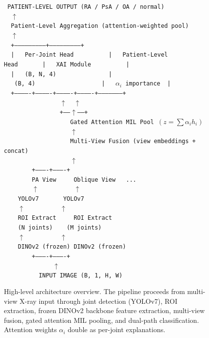 \documentclass{article}
\begin{document}
\begin{figure}[h]
\centering
\begin{minipage}{0.92\linewidth}
\small\tt
\noindent
PATIENT-LEVEL OUTPUT (RA / PsA / OA / normal)\\
~~$\uparrow$~~\\
~~Patient-Level Aggregation (attention-weighted pool)\\
~~$\uparrow$~~\\
~~+---------------------------+---------------------------+\\
~~|~~~Per-Joint Head~~~~~~~~~~|~~~Patient-Level Head~~~~~~~|~~~XAI Module~~~~~~~~~~|\\
~~|~~~(B,~N,~4)~~~~~~~~~~~~~~~|~~~(B,~4)~~~~~~~~~~~~~~~~~~~|~~~$\alpha_i$~importance~~|\\
~~+-------------+-------------+-------------+-------------+---------------------+\\
~~~~~~~~~~~~~~~~$\uparrow$~~$\uparrow$~~\\
~~~~~~~~~~~~~~~~+------$\uparrow$------+\\
~~~~~~~~~~~~~~~~~~~Gated Attention MIL Pool $(z = \sum \alpha_i h_i)$\\
~~~~~~~~~~~~~~~~~~~$\uparrow$\\
~~~~~~~~~~~~~~~~~~~Multi-View Fusion (view embeddings + concat)\\
~~~~~~~~~~~~~~~~~~~$\uparrow$\\
~~~~~~~~+----------+----------+\\
~~~~~~~~PA View~~~~~Oblique View~~~...\\
~~~~~~~~$\uparrow$~~~~~~~~~~$\uparrow$\\
~~~~YOLOv7~~~~~~~YOLOv7\\
~~~~$\uparrow$~~~~~~~~~~$\uparrow$\\
~~~~ROI Extract~~~~~ROI Extract\\
~~~~(N joints)~~~~(M joints)\\
~~~~$\uparrow$~~~~~~~~~~$\uparrow$\\
~~~~DINOv2 (frozen)~DINOv2 (frozen)\\
~~~~~~~~+----------+----------+\\
~~~~~~~~~~~~~~$\uparrow$\\
~~~~~~~~~~INPUT IMAGE (B,~1,~H,~W)
\end{minipage}
\caption{High-level architecture overview. The pipeline proceeds from multi-view X-ray input through joint detection (YOLOv7), ROI extraction, frozen DINOv2 backbone feature extraction, multi-view fusion, gated attention MIL pooling, and dual-path classification. Attention weights $\alpha_i$ double as per-joint explanations.}
\label{fig:arch}
\end{figure}
\end{document}
